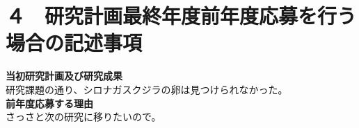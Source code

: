 \documentclass[11pt,a4j,dvipdfmx]{jarticle} 					%
\newcommand{\研究課題名}{象の卵}
\newcommand{\研究機関名}{逢坂大学}
\newcommand{\研究代表者氏名}{湯川秀樹}
\newcommand{\研究期間の最終元号年度}{9}  %
\begin{document}



\section{４　研究計画最終年度前年度応募を行う場合の記述事項}

\newcommand{\最終年度研究種目名}{基盤研究（Z）}
\newcommand{\最終年度研究課題番号}{99999}
\newcommand{\最終年度研究課題名}{シロナガスクジラの卵はなぜ見つけられないのか}
\newcommand{\最終年度研究期間}{平成25年度〜令和\一年目 年度}


\noindent
\textbf{当初研究計画及び研究成果}\\
	研究課題の通り、シロナガスクジラの卵は見つけられなかった。
\\

\noindent
\textbf{前年度応募する理由}\\
	さっさと次の研究に移りたいので。



\end{document}
